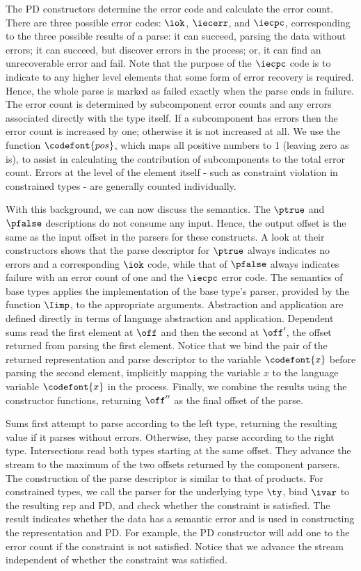 The PD constructors determine the error code and calculate the error
count.  There are three possible error codes: $\iok$, $\iecerr$, and
$\iecpc$, corresponding to the three possible results of a parse: it
can succeed, parsing the data without errors; it can succeed, but
discover errors in the process; or, it can find an unrecoverable error
and fail.  Note that the purpose of the $\iecpc$ code is to
indicate to any higher level elements that some form of error recovery
is required.  Hence, the whole parse is marked as failed exactly when
the parse ends in failure.  The error count is determined by
subcomponent error counts and any errors associated directly with the
type itself.  If a subcomponent has errors then the error count is
increased by one; otherwise it is not increased at all. We use the
function $\codefont {pos}$, which maps all positive numbers to 1
(leaving zero as is), to assist in calculating the contribution of
subcomponents to the total error count.  Errors at the level of the
element itself - such as constraint violation in constrained types -
are generally counted individually.

With this background, we can now discuss the semantics.  The $\ptrue$ and
$\pfalse$ descriptions do not consume any input. Hence, the output offset is the
same as the input offset in the parsers for these constructs. A look
at their constructors shows that the parse descriptor for $\ptrue$
always indicates no errors and a corresponding $\iok$ code, while that
of $\pfalse$ always indicates failure with an error count of one and
the $\iecpc$ error code. The semantics of base types applies the
implementation of the base type's parser, provided by the function
$\Iimp$, to the appropriate arguments.  Abstraction and application
are defined directly in terms of \implang language abstraction and
application.  Dependent sums read the first element at $\off$ and then
the second at $\off'$, the offset returned from parsing the first
element.  Notice that we bind the pair of the returned representation
and parse descriptor to the variable $\codefont{x}$ before parsing the
second element, implicitly mapping the \ddc{} variable $x$ to the
\implang{} language variable $\codefont{x}$ in the process.  Finally,
we combine the results using the constructor functions, returning
$\off''$ as the final offset of the parse.

Sums first attempt to parse according to the left type, returning the resulting
value if it parses without errors. Otherwise, they parse according to
the right type. Intersections read both types starting at the same
offset. They advance the stream to the maximum of the two offsets
returned by the component parsers. The construction of the parse
descriptor is similar to that of products. For constrained types, we call the
parser for the underlying type $\ty$, bind $\ivar$ to the resulting rep
and PD, and check whether the constraint is satisfied. The result
indicates whether the data has a semantic error and is used in
constructing the representation and PD. For example, the PD constructor will add
one to the error count if the constraint is not satisfied. Notice that
we advance the stream independent of whether the constraint was
satisfied.

